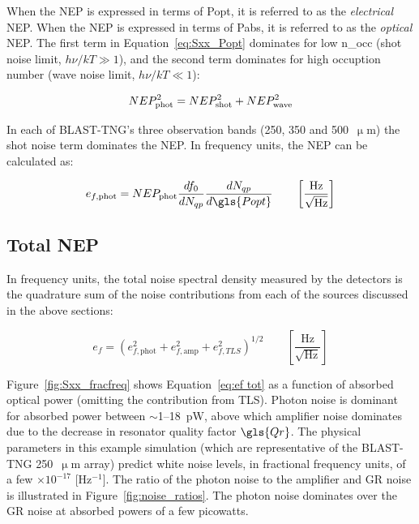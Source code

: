 When the NEP is expressed in terms of \gls{Popt}, it is referred to as the \textit{electrical} NEP. When the NEP is expressed in terms of \gls{Pabs}, it is referred to as the \textit{optical} NEP. The first term in Equation~\ref{eq:Sxx_Popt} dominates for low \gls{n_occ} (shot noise limit, $h\nu / kT \gg 1$), and the second term dominates for high occuption number (wave noise limit, $h\nu / kT \ll 1$):

\begin{equation}\label{eq:NEP phot}
NEP_{\mathrm{phot}}^{2} = NEP_{\mathrm{shot}}^{2} + NEP_{\mathrm{wave}}^{2} \\
\end{equation}

In each of BLAST-TNG's three observation bands (250, 350 and 500~$\upmu$m) the shot noise term dominates the NEP. In frequency units, the NEP can be calculated as:

\begin{equation} \label{eq:ef phot}
  e_{f,\mathrm{phot}} = NEP_{\mathrm{phot}}\frac{df_{0}}{dN_{qp}}\frac{dN_{qp}}{d\gls{Popt}} \qquad \left[ \frac{\mathrm{Hz}}{\sqrt{\mathrm{Hz}}} \right]
\end{equation}

\subsection{Total NEP}

In frequency units, the total noise spectral density measured by the detectors is the quadrature sum of the noise contributions from each of the sources discussed in the above sections:

\begin{equation} \label{eq:ef tot}
  e_{f} = \left( e_{f,\mathrm{phot}}^{2}  + e_{f,\mathrm{amp}}^{2} + e_{f,TLS}^{2} \right)^{1/2} \qquad \left[ \frac{\mathrm{Hz}}{\sqrt{\mathrm{Hz}}} \right]
\end{equation}

Figure~\ref{fig:Sxx_fracfreq} shows Equation~\ref{eq:ef tot} as a function of absorbed optical power (omitting the contribution from TLS). Photon noise is dominant for absorbed power between $\sim$1--18~pW, above which amplifier noise dominates due to the decrease in resonator quality factor $\gls{Qr}$. The physical parameters in this example simulation (which are representative of the BLAST-TNG 250~$\upmu$m array) predict white noise levels, in fractional frequency units, of a few $\times 10^{-17}$ [Hz$^{-1}$]. The ratio of the photon noise to the amplifier and GR noise is illustrated in Figure~\ref{fig:noise_ratios}. The photon noise dominates over the GR noise at absorbed powers of a few picowatts.

